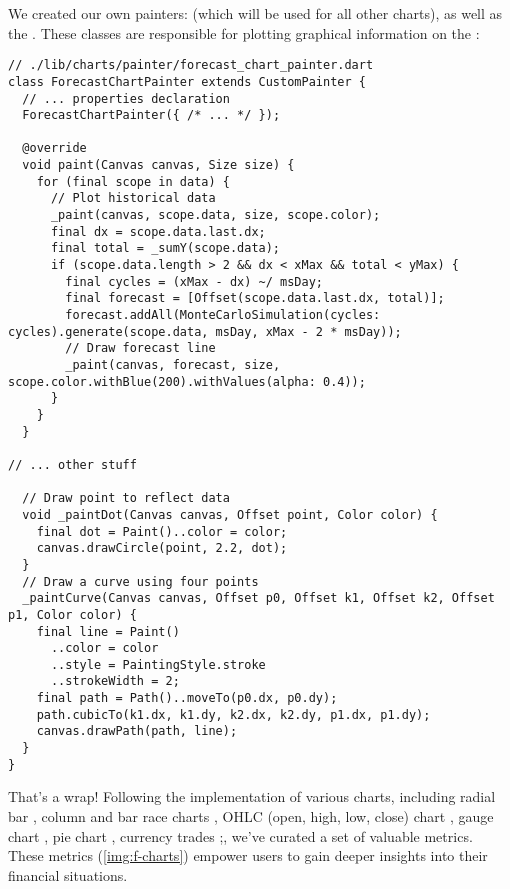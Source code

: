 \noindent We created our own painters:  (which will be used for all other charts), as well as 
the . These classes are responsible for plotting graphical information on the :

\begin{lstlisting}
// ./lib/charts/painter/forecast_chart_painter.dart
class ForecastChartPainter extends CustomPainter {
  // ... properties declaration
  ForecastChartPainter({ /* ... */ });

  @override
  void paint(Canvas canvas, Size size) {
    for (final scope in data) {
      // Plot historical data
      _paint(canvas, scope.data, size, scope.color);
      final dx = scope.data.last.dx;
      final total = _sumY(scope.data);
      if (scope.data.length > 2 && dx < xMax && total < yMax) {
        final cycles = (xMax - dx) ~/ msDay;
        final forecast = [Offset(scope.data.last.dx, total)];
        forecast.addAll(MonteCarloSimulation(cycles: cycles).generate(scope.data, msDay, xMax - 2 * msDay));
        // Draw forecast line
        _paint(canvas, forecast, size, scope.color.withBlue(200).withValues(alpha: 0.4));
      }
    }
  }

// ... other stuff

  // Draw point to reflect data
  void _paintDot(Canvas canvas, Offset point, Color color) {
    final dot = Paint()..color = color;
    canvas.drawCircle(point, 2.2, dot);
  }
  // Draw a curve using four points
  _paintCurve(Canvas canvas, Offset p0, Offset k1, Offset k2, Offset p1, Color color) {
    final line = Paint()
      ..color = color
      ..style = PaintingStyle.stroke
      ..strokeWidth = 2;
    final path = Path()..moveTo(p0.dx, p0.dy);
    path.cubicTo(k1.dx, k1.dy, k2.dx, k2.dy, p1.dx, p1.dy);
    canvas.drawPath(path, line);
  }
}
\end{lstlisting}

\noindent That's a wrap! Following the implementation of various charts, including radial bar , column 
and bar race charts , OHLC (open, high, low, close) chart , gauge chart  
, pie chart , currency trades ;, we've curated a set of valuable metrics. 
These metrics (\cref{img:f-charts}) empower users to gain deeper insights into their financial situations.

